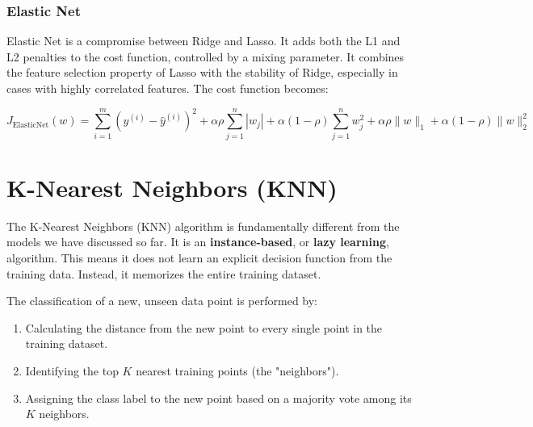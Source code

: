 \subsubsection*{Elastic Net}
Elastic Net is a compromise between Ridge and Lasso. It adds both the L1 and L2 penalties to the cost function, controlled by a mixing parameter. It combines the feature selection property of Lasso with the stability of Ridge, especially in cases with highly correlated features. The cost function becomes:

$$
J_{\text{ElasticNet}}(w) = \sum_{i=1}^{m} (y^{(i)} - \hat{y}^{(i)})^2 + \alpha \rho \sum_{j=1}^{n} |w_j| + \alpha (1-\rho) \sum_{j=1}^{n} w_j^2 + \alpha \rho \|w\|_1 + \alpha (1-\rho) \|w\|_2^2
$$

\section{K-Nearest Neighbors (KNN)}
\label{sec:knn}
The K-Nearest Neighbors (KNN) algorithm is fundamentally different from the models we have discussed so far. It is an \textbf{instance-based}, or \textbf{lazy learning}, algorithm. This means it does not learn an explicit decision function from the training data. Instead, it memorizes the entire training dataset.

The classification of a new, unseen data point is performed by:
\begin{enumerate}
    \item Calculating the distance from the new point to every single point in the training dataset.
    \item Identifying the top $K$ nearest training points (the "neighbors").
    \item Assigning the class label to the new point based on a majority vote among its $K$ neighbors.
\end{enumerate}

